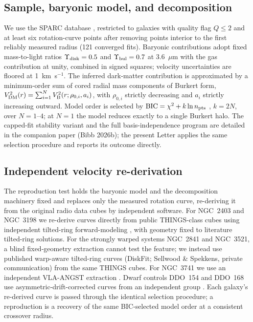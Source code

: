 \documentclass[linenumbers,twocolumn]{aastex701}
\begin{document}
\subsection{Sample, baryonic model, and decomposition}
We use the SPARC database \citep{Lelli2016}, restricted to galaxies with quality
flag $Q \le 2$ and at least six rotation-curve points after removing points
interior to the first reliably measured radius (121 converged fits). Baryonic
contributions adopt fixed mass-to-light ratios $\Upsilon_{\rm disk} = 0.5$ and
$\Upsilon_{\rm bul} = 0.7$ at 3.6~$\mu$m with the gas contribution at unity,
combined in signed squares; velocity uncertainties are floored at 1~km~s$^{-1}$.
The inferred dark-matter contribution is approximated by a minimum-order sum of
cored radial mass components of Burkert form, $V^2_{\rm DM}(r) = \sum_{i=1}^{N}
V^2_{\rm B}(r;\rho_{0,i},a_i)$, with $\rho_{0,i}$ strictly decreasing and $a_i$
strictly increasing outward. Model order is selected by ${\rm BIC} = \chi^2 + k
\ln n_{\rm pts}$ \citep{Schwarz1978,Liddle2007}, $k = 2N$, over $N = 1$--$4$; at
$N = 1$ the model reduces exactly to a single Burkert halo. The capped-fit stability
variant and the full basis-independence program are detailed in the companion paper
(Bibb 2026b); the present Letter applies the same selection procedure and reports its
outcome directly.

\subsection{Independent velocity re-derivation}
The reproduction test holds the baryonic model and the decomposition machinery
fixed and replaces only the measured rotation curve, re-deriving it from the
original radio data cubes by independent software. For NGC~2403 and NGC~3198 we
re-derive curves directly from public THINGS-class cubes using independent
tilted-ring forward-modeling \citep[$^{3\rm D}$Barolo;][]{DiTeodoro2015}, with
geometry fixed to literature tilted-ring solutions. For the strongly warped
systems NGC~2841 and NGC~3521, a blind fixed-geometry extraction cannot test the
feature; we instead use published warp-aware tilted-ring curves (DiskFit;
Sellwood \& Spekkens, private communication) from the same THINGS cubes. For
NGC~3741 we use an independent VLA-ANGST extraction \citep[a different telescope
from the WSRT-based SPARC curve;][]{Walter2008}. Dwarf controls DDO~154 and
DDO~168 use asymmetric-drift-corrected curves from an independent group
\citep[3D forward-modeling;][]{Iorio2017}. Each galaxy's re-derived curve is
passed through the identical selection procedure; a reproduction is a recovery of
the same BIC-selected model order at a consistent crossover radius.
\end{document}
